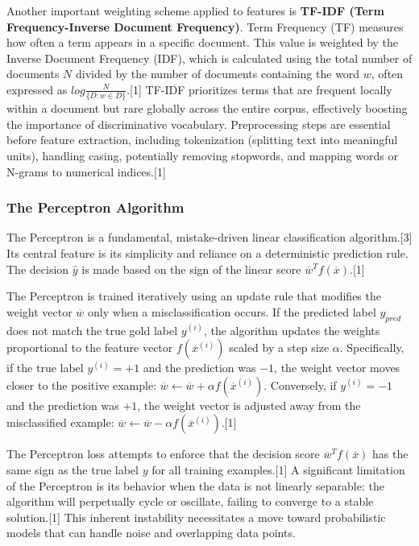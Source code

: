 \documentclass{article}
\begin{document}
Another important weighting scheme applied to features is \textbf{TF-IDF (Term Frequency-Inverse Document Frequency)}. Term Frequency (TF) measures how often a term appears in a specific document. This value is weighted by the Inverse Document Frequency (IDF), which is calculated using the total number of documents $N$ divided by the number of documents containing the word $w$, often expressed as $log\frac{N}{\{D: w \in D\}}$.[1] TF-IDF prioritizes terms that are frequent locally within a document but rare globally across the entire corpus, effectively boosting the importance of discriminative vocabulary. Preprocessing steps are essential before feature extraction, including tokenization (splitting text into meaningful units), handling casing, potentially removing stopwords, and mapping words or N-grams to numerical indices.[1]

\subsubsection{The Perceptron Algorithm}

The Perceptron is a fundamental, mistake-driven linear classification algorithm.[3] Its central feature is its simplicity and reliance on a deterministic prediction rule. The decision $\hat{y}$ is made based on the sign of the linear score $\overline{w}^{T}f(\overline{x})$.[1]

The Perceptron is trained iteratively using an update rule that modifies the weight vector $\overline{w}$ only when a misclassification occurs. If the predicted label $y_{pred}$ does not match the true gold label $y^{(i)}$, the algorithm updates the weights proportional to the feature vector $f(\overline{x}^{(i)})$ scaled by a step size $\alpha$. Specifically, if the true label $y^{(i)} = +1$ and the prediction was $-1$, the weight vector moves closer to the positive example: $\overline{w} \leftarrow \overline{w} + \alpha f(\overline{x}^{(i)})$. Conversely, if $y^{(i)} = -1$ and the prediction was $+1$, the weight vector is adjusted away from the misclassified example: $\overline{w} \leftarrow \overline{w} - \alpha f(\overline{x}^{(i)})$.[1]

The Perceptron loss attempts to enforce that the decision score $\overline{w}^{T}f(\overline{x})$ has the same sign as the true label $y$ for all training examples.[1] A significant limitation of the Perceptron is its behavior when the data is not linearly separable: the algorithm will perpetually cycle or oscillate, failing to converge to a stable solution.[1] This inherent instability necessitates a move toward probabilistic models that can handle noise and overlapping data points.
\end{document}
